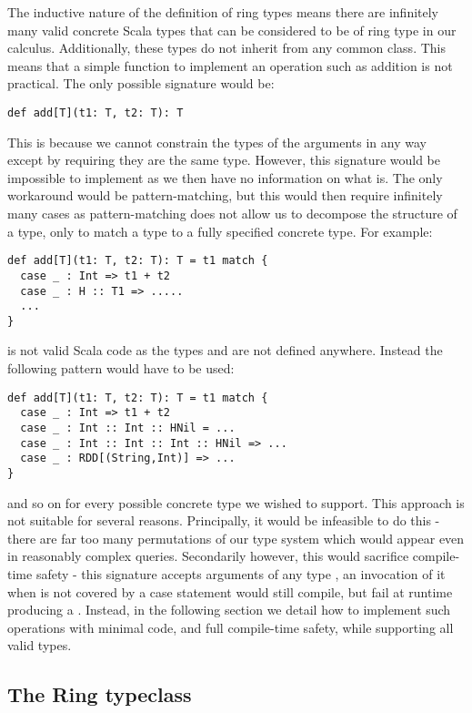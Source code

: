 The inductive nature of the definition of ring types means there are infinitely many valid concrete Scala types that can be considered to be of ring type in our calculus. Additionally, these types do not inherit from any common class. This means that a simple function to implement an operation such as addition is not practical. The only possible signature would be:
\vs\begin{lstlisting}
def add[T](t1: T, t2: T): T
\end{lstlisting}\vs
This is because we cannot constrain the types of the arguments in any way except by requiring they are the same type. However, this signature would be impossible to implement as we then have no information on what  is. The only workaround would be pattern-matching, but this would then require infinitely many cases as pattern-matching does not allow us to decompose the structure of a type, only to match a type to a fully specified concrete type. For example:
\vs\begin{lstlisting}
def add[T](t1: T, t2: T): T = t1 match {
  case _ : Int => t1 + t2
  case _ : H :: T1 => .....
  ...
}
\end{lstlisting}\vs
is not valid Scala code as the types  and  are not defined anywhere. Instead the following pattern would have to be used:
\vs\begin{lstlisting}
def add[T](t1: T, t2: T): T = t1 match {
  case _ : Int => t1 + t2
  case _ : Int :: Int :: HNil = ...
  case _ : Int :: Int :: Int :: HNil => ...
  case _ : RDD[(String,Int)] => ...
}
\end{lstlisting}\vs
and so on for every possible concrete type we wished to support. This approach is not suitable for several reasons. Principally, it would be infeasible to do this - there are far too many permutations of our type system which would appear even in reasonably complex queries. Secondarily however, this would sacrifice compile-time safety - this signature accepts arguments of any type , an invocation of it when  is not covered by a case statement would still compile, but fail at runtime producing a . Instead, in the following section we detail how to implement such operations with minimal code, and full compile-time safety, while supporting all valid types.

\subsection{The Ring typeclass}

